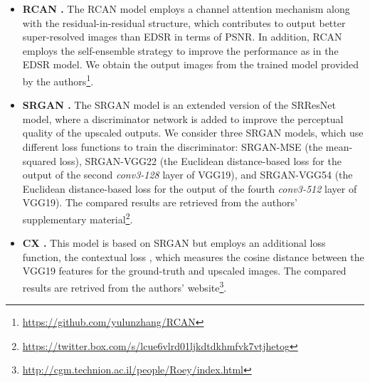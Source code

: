 \documentclass[runningheads]{llncs}
\begin{document}
\begin{itemize}
	\item \textbf{RCAN \cite{zhang2018image}.}
	The RCAN model employs a channel attention mechanism along with the residual-in-residual structure, which contributes to output better super-resolved images than EDSR in terms of PSNR.
	In addition, RCAN employs the self-ensemble strategy to improve the performance as in the EDSR model.
	We obtain the output images from the trained model provided by the authors\footnote{\url{https://github.com/yulunzhang/RCAN}}.	\\
	
	\item \textbf{SRGAN \cite{ledig2017photo}.}
	The SRGAN model is an extended version of the SRResNet model, where a discriminator network is added to improve the perceptual quality of the upscaled outputs.
	We consider three SRGAN models, which use different loss functions to train the discriminator: SRGAN-MSE (the mean-squared loss), SRGAN-VGG22 (the Euclidean distance-based loss for the output of the second \textit{conv3-128} layer of VGG19), and SRGAN-VGG54 (the Euclidean distance-based loss for the output of the fourth \textit{conv3-512} layer of VGG19).
	The compared results are retrieved from the authors' supplementary material\footnote{\url{https://twitter.box.com/s/lcue6vlrd01ljkdtdkhmfvk7vtjhetog}}.\\
	
	\item \textbf{CX \cite{mechrez2018learning}.}
	This model is based on SRGAN but employs an additional loss function, the contextual loss \cite{mechrez2018contextual}, which measures the cosine distance between the VGG19 features for the ground-truth and upscaled images.
	The compared results are retrived from the authors' website\footnote{\url{http://cgm.technion.ac.il/people/Roey/index.html}}.
	
\end{itemize}
\end{document}
